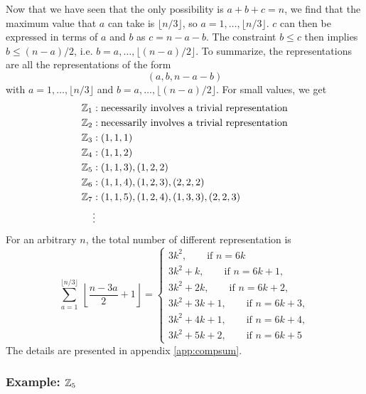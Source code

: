             Now that we have seen that the only possibility is $a+b+c=n$, we find that the maximum value that $a$ can take is $\lfloor n/3\rfloor$, so $a=1,\dots,\lfloor n/3\rfloor$. $c$ can then be expressed in terms of $a$ and $b$ as $c=n-a-b$. The constraint $b\leq c$ then implies $b\leq (n-a)/2$, i.e. $b=a,\dots,\lfloor (n-a)/2\rfloor$. To summarize, the representations are all the representations of the form
            \begin{equation}
                (a,b,n-a-b)
            \end{equation}
            with $a=1,\dots,\lfloor n/3\rfloor$ and $b=a,\dots,\lfloor (n-a)/2\rfloor$. For small values, we get
            \begin{align*}
                \mathbb{Z}_1 &: \text{necessarily involves a trivial representation}\\
                \mathbb{Z}_2 &: \text{necessarily involves a trivial representation}\\
                \mathbb{Z}_3 &: (1,1,1)\\
                \mathbb{Z}_4 &: (1,1,2)\\
                \mathbb{Z}_5 &: (1,1,3),(1,2,2)\label{reprZ5C3}\\
                \mathbb{Z}_6 &: (1,1,4),(1,2,3),(2,2,2)\\
                \mathbb{Z}_7 &: (1,1,5),(1,2,4),(1,3,3),(2,2,3)\\
                &\vdots
            \end{align*}
            For an arbitrary $n$, the total number of different representation is
            \begin{equation}
                \sum^{\lfloor n/3\rfloor}_{a=1}~\left\lfloor \frac{n-3a}{2}+1\right\rfloor = \begin{cases}
                    3k^2,\qquad\text{if $n=6k$}\\
                    3k^2+k,\qquad\text{if $n=6k+1$},\\
                    3k^2+2k,\qquad\text{if $n=6k+2$},\\
                    3k^2+3k+1,\qquad\text{if $n=6k+3$},\\
                    3k^2+4k+1,\qquad\text{if $n=6k+4$},\\
                    3k^2+5k+2,\qquad\text{if $n=6k+5$}
                \end{cases}
            \end{equation}
            The details are presented in appendix \ref{app:compsum}.

        \subsubsection{Example: $\mathbb{Z}_5$}

